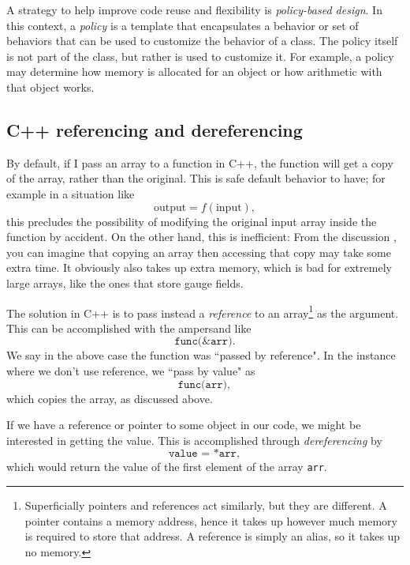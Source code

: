 A strategy to help improve code reuse and flexibility is {\it policy-based design}.
In this context, a {\it policy} is a template that encapsulates a 
behavior or set of behaviors that can be used to customize the behavior of a class. 
The policy itself is not part of the class, but rather is used to customize it. 
For example, a policy may determine how memory is allocated for an object
or how arithmetic with that object works.

\subsection{C++ referencing and dereferencing}

By default, if I pass an array to a function in C++, the function will get a
copy of the array, rather than the original. This is safe default behavior to
have; for example in a situation like
\begin{equation}
\text{output}=f(\text{input}),
\end{equation}
this precludes the possibility of modifying the original input array inside the
function by accident. On the other hand, this is inefficient: From the
discussion , you can imagine that copying an array then
accessing that copy may take some extra time. It obviously also takes up extra
memory, which is bad for extremely large arrays, like the ones that store gauge
fields.

The solution in C++ is to pass instead a {\it reference} to an 
array\footnote{Superficially pointers and references act similarly, but they are
different. A pointer contains a memory address, hence it takes up however much
memory is required to store that address. A reference is simply an alias, so it
takes up no memory.} as the argument. This can be accomplished with the
ampersand like
\begin{equation*}
\texttt{func(\&arr)}.
\end{equation*}
We say in the above case the function was ``passed by reference". In the
instance where we don't use reference, we ``pass by value" as
\begin{equation*}
\texttt{func(arr)},
\end{equation*}
which copies the array, as discussed above.

If we have a reference or pointer to some object in our code, we might be interested in
getting the value. This is accomplished through {\it
dereferencing} by
\begin{equation*}
\texttt{value = *arr},
\end{equation*}
which would return the value of the first element of the array \texttt{arr}.

